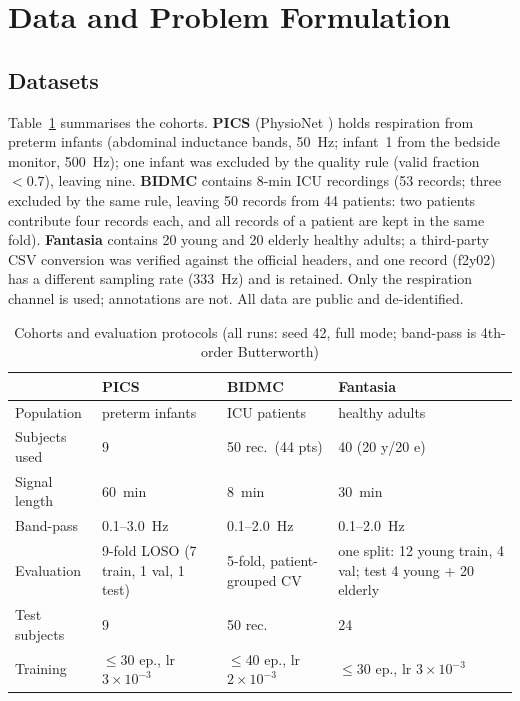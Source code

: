 \documentclass[conference]{IEEEtran}
\begin{document}
\section{Data and Problem Formulation}
\subsection{Datasets}
Table~\ref{tab:data} summarises the cohorts. \textbf{PICS} \cite{rPics,rGee} (PhysioNet \cite{rPhysionet}) holds respiration from preterm infants (abdominal inductance bands, 50~Hz; infant~1 from the bedside monitor, 500~Hz); one infant was excluded by the quality rule (valid fraction $<0.7$), leaving nine. \textbf{BIDMC} contains 8-min ICU recordings (53 records; three excluded by the same rule, leaving 50 records from 44 patients: two patients contribute four records each, and all records of a patient are kept in the same fold). \textbf{Fantasia} contains 20 young and 20 elderly healthy adults; a third-party CSV conversion was verified against the official headers, and one record (f2y02) has a different sampling rate (333~Hz) and is retained. Only the respiration channel is used; annotations are not. All data are public and de-identified.

\begin{table}[t]
\caption{Cohorts and evaluation protocols (all runs: seed 42, full mode; band-pass is 4th-order Butterworth)}
\label{tab:data}
\centering\footnotesize
\setlength{\tabcolsep}{3pt}
\begin{tabular}{@{}p{}p{}p{}p{}@{}}
\toprule
 & PICS & BIDMC & Fantasia\\
\midrule
Population & preterm infants & ICU patients & healthy adults\\
Subjects used & 9 & 50 rec.\ (44 pts) & 40 (20 y/20 e)\\
Signal length & 60~min & 8~min & 30~min\\
Band-pass & 0.1--3.0~Hz & 0.1--2.0~Hz & 0.1--2.0~Hz\\
Evaluation & 9-fold LOSO (7 train, 1 val, 1 test) & 5-fold, patient-grouped CV & one split: 12 young train, 4 val; test 4 young + 20 elderly\\
Test subjects & 9 & 50 rec. & 24\\
Training & $\le$30 ep., lr $3\!\times\!10^{-3}$ & $\le$40 ep., lr $2\!\times\!10^{-3}$ & $\le$30 ep., lr $3\!\times\!10^{-3}$\\
\bottomrule
\end{tabular}
\end{table}
\end{document}
